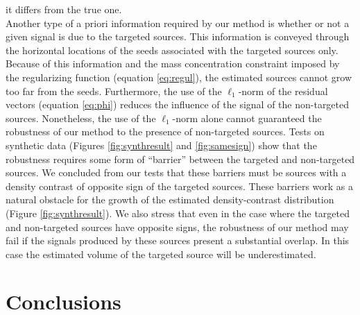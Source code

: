 it differs from the true one.
\\ \indent
Another type of a priori information required by our method is whether or not
a given signal is due to the targeted sources.
This information is conveyed through the horizontal locations of the seeds
associated with the targeted sources only.
Because of this information and the mass concentration constraint imposed by the
regularizing function (equation \ref{eq:regul}), the estimated sources cannot
grow too far from the seeds.
Furthermore, the use of the $\ell_1$-norm of the residual vectors (equation
\ref{eq:phi}) reduces the influence of the signal of the non-targeted sources.
Nonetheless, the use of the $\ell_1$-norm alone cannot guaranteed the
robustness of our method to the presence of non-targeted sources.
Tests on synthetic data
(Figures \ref{fig:synthresult} and \ref{fig:samesign})
show that the robustness requires some form of ``barrier''
between the targeted and non-targeted sources.
We concluded from our tests that these barriers must be sources with a density
contrast of opposite sign of the targeted sources.
These barriers work as a natural obstacle for the growth of the estimated
density-contrast distribution (Figure \ref{fig:synthresult}).
We also stress that even in the case where the targeted and non-targeted sources
have opposite signs, the robustness of our method may fail if the signals
produced by these sources present a substantial overlap.
In this case the estimated volume of the targeted source will be
underestimated.

\section{Conclusions}

